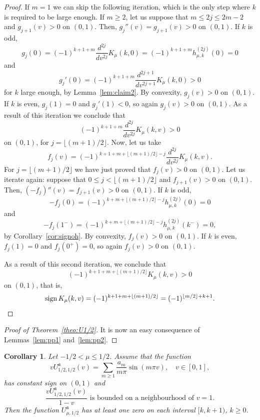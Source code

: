 \documentclass[10pt,a4paper]{article}
\numberwithin{equation}{section}
\theoremstyle{plain}
\newtheorem{Cor}[Theo]{Corollary}
\theoremstyle{definition}
\newcommand{\aA}{\mathfrak{a}}
\newcommand{\sign}{\operatorname{sign}}
\begin{document}
\begin{proof}
If $m=1$ we can skip the following iteration, which is the only step where $k$ is required to be large enough. If $m \geq 2$, let us suppose that $m \leq 2j \leq 2m-2$ and $g_{j+1}(v) > 0$ on $(0,1)$. Then, $g_j''(v) = g_{j+1}(v) > 0$ on $(0,1)$. If $k$ is odd,
\[
   g_j(0) = (-1)^{k+1+m} \frac{d^{2j}}{dv^{2j}} K_\mu(k,0)
   = (-1)^{k+1+m} h_{\mu,k}^{(2j)}(0)
   = 0
\]
and
\[
   g_j'(0) = (-1)^{k+1+m} \frac{d^{2j+1}}{dv^{2j+1}} K_\mu(k,0)
   > 0
\]
for $k$ large enough, by Lemma~\ref{lem:claim2}. By convexity, $g_j(v) > 0$ on $(0,1)$. If $k$ is even, $g_j(1) = 0$ and $g_j'(1) < 0$, so again $g_j(v) > 0$ on $(0,1)$. As a result of this iteration we conclude that
\[
   (-1)^{k+1+m} \frac{d^{2j}}{dv^{2j}} K_\mu(k,v)
   > 0
\]
on $(0,1)$, for $j = \lfloor(m+1)/2\rfloor$. Now, let us take
\[
   f_j(v) = (-1)^{k+1+m+\lfloor(m+1)/2\rfloor-j} \frac{d^{2j}}{dv^{2j}} K_\mu(k,v).
\]
For $j = \lfloor(m+1)/2\rfloor$ we have just proved that $f_j(v) > 0$ on $(0,1)$. Let us iterate again: suppose that $0 \leq j < \lfloor(m+1)/2\rfloor$ and $f_{j+1}(v) > 0$ on $(0,1)$. Then, $(-f_j)''(v) = f_{j+1}(v) > 0$ on $(0,1)$. If $k$ is odd,
\[
   -f_j(0) = (-1)^{k+m+\lfloor(m+1)/2\rfloor-j} h_{\mu,k}^{(2j)}(0)
   = 0
\]
and
\[
   -f_j(1^-) = (-1)^{k+m+\lfloor(m+1)/2\rfloor-j} h_{\mu,k}^{(2j)}(k^-)
   = 0,
\]
by Corollary~\ref{cor:signoh}. By convexity, $f_j(v) > 0$ on $(0,1)$. If $k$ is even, $f_j(1) = 0$ and $f_j(0^+) = 0$, so again $f_j(v) > 0$ on $(0,1)$.

As a result of this second iteration, we conclude that
\[
   (-1)^{k+1+m+\lfloor(m+1)/2\rfloor} K_\mu(k,v) > 0
\]
on $(0,1)$, that is,
\[
   \sign K_\mu(k,v) = (-1)^{k+1+m+\lfloor(m+1)/2\rfloor}
   = (-1)^{\lfloor m/2\rfloor + k+1}.
   \qedhere
\]
\end{proof}

\begin{proof}[Proof of Theorem~\ref{theo:U1/2}]
It is now an easy consequence of Lemmas~\ref{lem:pp1} and~\ref{lem:pp2}.
\end{proof}

\begin{Cor}
\label{cor:U1/2}
Let $-1/2<\mu\le 1/2$. Assume that the function
\[
   vU_{1/2,1/2}^{\aA}(v) = \sum_{m\ge 1} \frac{a_m}{m\pi}\sin(m\pi v), \quad v\in [0,1],
\]
has constant sign on $(0,1)$ and
\begin{equation}
\label{eq:U1-v}
   \frac{vU_{1/2,1/2}^{\aA}(v)}{1-v} \text{ is bounded on a neighbourhood of $v=1$}.
\end{equation}
Then the function $U_{\mu,1/2}^{\aA}$ has at least one zero on each interval $[k,k+1)$, $k\ge 0$.
\end{Cor}
\end{document}
